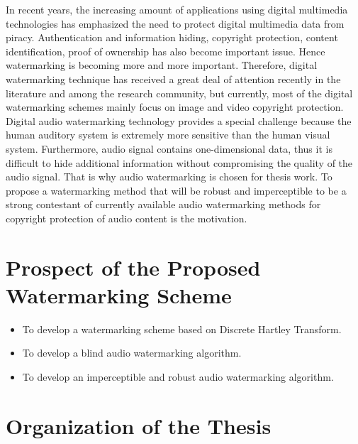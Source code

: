 \documentclass[12pt,a4paper]{report}
\begin{document}
In recent years, the increasing amount of applications using digital multimedia technologies has emphasized the need to protect digital multimedia data from piracy. Authentication and information hiding, copyright protection, content identification, proof of ownership has also become important issue. Hence watermarking is becoming more and more important. Therefore, digital watermarking technique has received a great deal of attention recently in the literature and among the research community, but currently, most of the digital watermarking schemes mainly focus on image and video copyright protection. Digital audio watermarking technology provides a special challenge because the human auditory system is extremely more sensitive than the human visual system. Furthermore, audio signal contains
one-dimensional data, thus it is difficult to hide additional information without compromising the quality of the audio signal. That is why audio watermarking is chosen for thesis work. To propose a watermarking method that will be robust and imperceptible to be a strong contestant of currently available audio watermarking methods for copyright protection of audio content is the motivation.


\section{Prospect of the Proposed Watermarking Scheme}


\begin{itemize}

\item 
To develop a watermarking scheme based on Discrete Hartley Transform.

\item
To develop a blind audio watermarking algorithm.

\item
To develop an imperceptible and robust audio watermarking algorithm.

\end{itemize}


\section{Organization of the Thesis}
\end{document}
